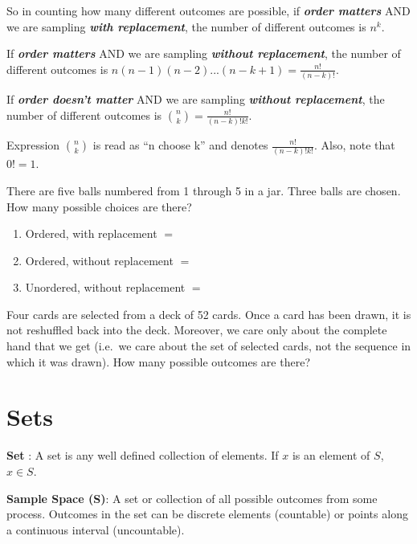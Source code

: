 \documentclass[]{book}
\theoremstyle{definition}
\theoremstyle{definition}
\theoremstyle{definition}
\theoremstyle{remark}
\let\BeginKnitrBlock\begin \let\EndKnitrBlock\end
\begin{document}
So in counting how many different outcomes are possible, if
\textbf{\emph{order matters}} AND we are sampling \textbf{\emph{with
replacement}}, the number of different outcomes is \(n^k\).

If \textbf{\emph{order matters}} AND we are sampling
\textbf{\emph{without replacement}}, the number of different outcomes is
\(n(n-1)(n-2)...(n-k+1)=\frac{n!}{(n-k)!}\).

If \textbf{\emph{order doesn't matter}} AND we are sampling
\textbf{\emph{without replacement}}, the number of different outcomes is
\(\binom{n}{k} = \frac{n!}{(n-k)!k!}\).

Expression \(\binom{n}{k}\) is read as ``n choose k'' and denotes
\(\frac{n!}{(n-k)!k!}\). Also, note that \(0! = 1\).

\BeginKnitrBlock{example}[Counting]
\protect\hypertarget{exm:counting}{}{\label{exm:counting}
{} } There are five balls numbered from 1 through
5 in a jar. Three balls are chosen. How many possible choices are there?

\begin{enumerate}
\def\labelenumi{\arabic{enumi}.}
\item
  Ordered, with replacement \(=\)
\item
  Ordered, without replacement \(=\)
\item
  Unordered, without replacement \(=\)
\end{enumerate}
\EndKnitrBlock{example}

\BeginKnitrBlock{exercise}[Counting]
\protect\hypertarget{exr:counting1}{}{\label{exr:counting1}
{} } Four cards are selected from a deck of 52
cards. Once a card has been drawn, it is not reshuffled back into the
deck. Moreover, we care only about the complete hand that we get
(i.e.~we care about the set of selected cards, not the sequence in which
it was drawn). How many possible outcomes are there?
\EndKnitrBlock{exercise}

\section{Sets}\label{setoper}

\textbf{Set} : A set is any well defined collection of elements. If
\(x\) is an element of \(S\), \(x \in S\).

\textbf{Sample Space (S)}: A set or collection of all possible outcomes
from some process. Outcomes in the set can be discrete elements
(countable) or points along a continuous interval (uncountable).
\end{document}

